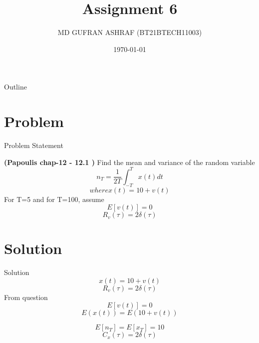\documentclass{beamer}
\title{Assignment 6 }
\author{MD GUFRAN ASHRAF (BT21BTECH11003)}
\date{\today}
\begin{document}
\begin{frame}
    \titlepage 
\end{frame}

\begin{frame}{Outline}
    \tableofcontents
\end{frame}


\section{Problem}
\begin{frame}{Problem Statement}

\textbf{(Papoulis chap-12 - 12.1 )}
Find the mean and variance of the random variable
\begin{equation*}
    n_{T} = \dfrac{1}{2T}\int_{-T}^{T}x(t)dt
\end{equation*}
\begin{equation*}
  where x(t)=10+v(t)  
\end{equation*}
For T=5 and for T=100, assume
\begin{equation*}
    E[v(t)] = 0 
\end{equation*}
        \begin{equation*}
            R_v(\tau) = 2\delta(\tau)
        \end{equation*}                          

\end{frame}


\section{Solution}
\begin{frame}{Solution}
\begin{equation}
    x(t)=10+v(t) 
\end{equation}
\begin{equation}
      R_v(\tau) = 2\delta(\tau)
\end{equation}
From question
\begin{equation}
     E[v(t)] = 0
\end{equation}
\begin{equation}
    E(x(t)) = E( 10 + v(t) )
    \end{equation}
    
\begin{equation}
    E[n_{T}] = E[x_{T}] = 10
\end{equation}
\begin{equation}
        C_{x}(\tau) = 2\delta(\tau)
\end{equation}
\end{frame} 
\end{document}
